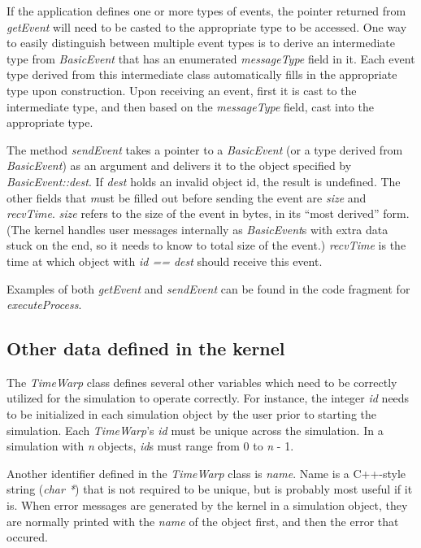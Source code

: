 \documentclass[11pt]{report}
\begin{document}
If the application defines one or more types of events, the pointer
returned from {\it getEvent} will need to be casted to the appropriate
type to be accessed. One way to easily distinguish between multiple
event types is to derive an intermediate type from {\it BasicEvent}
that has an enumerated {\it messageType} field in it.  Each event type
derived from this intermediate class automatically fills in the
appropriate type upon construction.  Upon receiving an event, first it
is cast to the intermediate type, and then based on the
{\it messageType} field, cast into the appropriate type.

The method {\it sendEvent} takes a pointer to a {\it BasicEvent} (or a
type derived from {\it BasicEvent}) as an argument and delivers it to
the object specified by {\it BasicEvent::dest}.  If {\it dest} holds
an invalid object id, the result is undefined.  The other fields that
{\emph must} be filled out before sending the event are {\it size} and
{\it recvTime}.  {\it size} refers to the size of the event in bytes,
in its ``most derived'' form.  (The kernel handles user messages
internally as {\it BasicEvent}s with extra data stuck on the end, so it
needs to know to total size of the event.)  {\it recvTime} is the time
at which object with {\it id == dest} should receive this event.

Examples of both {\it getEvent} and {\it sendEvent} can be found in
the code fragment for {\it executeProcess}.

\subsection{Other data defined in the kernel}

The {\it TimeWarp} class defines several other variables which need to
be correctly utilized for the simulation to operate correctly.  For
instance, the integer {\it id} needs to be initialized in each
simulation object by the user prior to starting the simulation.  Each
{\it TimeWarp}'s {\it id} must be unique across the simulation.  In a
simulation with {\it n} objects, {\it id}s must range from 0 to {\it n} -
1.

Another identifier defined in the {\it TimeWarp} class is {\it name}.
Name is a C++-style string ({\it char *}) that is not required to be
unique, but is probably most useful if it is.  When error messages are
generated by the kernel in a simulation object, they are normally
printed with the {\it name} of the object first, and then the error
that occured.
\end{document}
